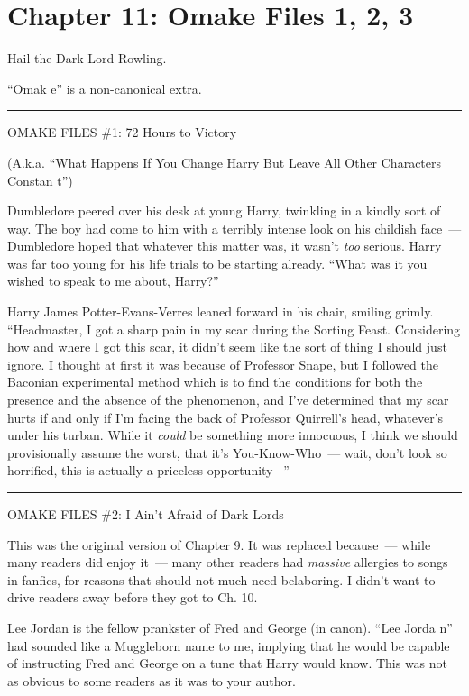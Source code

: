 \chapter{Chapter 11: Omake Files 1, 2, 3}
Hail the Dark Lord Rowling.

``Omak e'' is a non-canonical extra.

\begin{center}\rule{3in}{0.4pt}\end{center}

OMAKE FILES \#1: 72 Hours to Victory

(A.k.a. ``What Happens If You Change Harry But Leave All Other Characters Constan t'')

Dumbledore peered over his desk at young Harry, twinkling in a kindly sort of way. The boy had come to him with a terribly intense look on his childish face~--- Dumbledore hoped that whatever this matter was, it wasn't \emph{too} serious. Harry was far too young for his life trials to be starting already. ``What was it you wished to speak to me about, Harry?''

Harry James Potter-Evans-Verres leaned forward in his chair, smiling grimly. ``Headmaster, I got a sharp pain in my scar during the Sorting Feast. Considering how and where I got this scar, it didn't seem like the sort of thing I should just ignore. I thought at first it was because of Professor Snape, but I followed the Baconian experimental method which is to find the conditions for both the presence and the absence of the phenomenon, and I've determined that my scar hurts if and only if I'm facing the back of Professor Quirrell's head, whatever's under his turban. While it \emph{could} be something more innocuous, I think we should provisionally assume the worst, that it's You-Know-Who~--- wait, don't look so horrified, this is actually a priceless opportunity~-''

\begin{center}\rule{3in}{0.4pt}\end{center}

OMAKE FILES \#2: I Ain't Afraid of Dark Lords

This was the original version of Chapter 9. It was replaced because~--- while many readers did enjoy it~--- many other readers had \emph{massive} allergies to songs in fanfics, for reasons that should not much need belaboring. I didn't want to drive readers away before they got to Ch. 10.

Lee Jordan is the fellow prankster of Fred and George (in canon). ``Lee Jorda n'' had sounded like a Muggleborn name to me, implying that he would be capable of instructing Fred and George on a tune that Harry would know. This was not as obvious to some readers as it was to your author.

